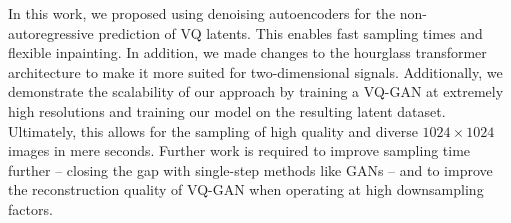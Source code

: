 In this work, we proposed using denoising autoencoders for the
non-autoregressive prediction of VQ latents. This enables fast sampling
times and flexible inpainting. In addition, we made changes to the hourglass
transformer architecture to make it more suited for two-dimensional signals.
Additionally, we demonstrate the scalability of our approach by training a
VQ-GAN at extremely high resolutions and training our model on the resulting
latent dataset. Ultimately, this allows for the sampling of high quality and
diverse $1024 \times 1024$ images in mere seconds. Further work is required to
improve sampling time further -- closing the gap with single-step methods like
GANs -- and to improve the reconstruction quality of VQ-GAN when operating at
high downsampling factors.
